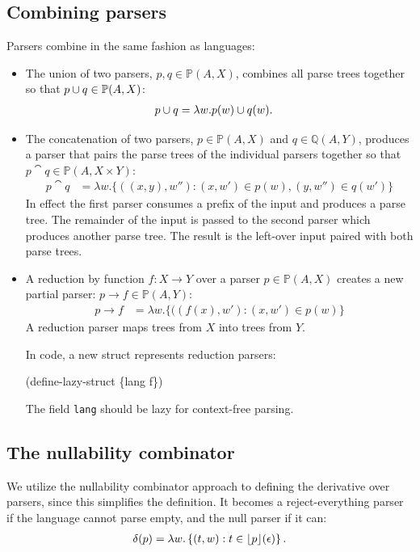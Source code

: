 \subsection{Combining parsers}
Parsers combine in the same fashion as languages:
\begin{itemize}
\item 
The union of two parsers,
$p, q \in \mathbb{P}(A,X)$,  combines all parse trees together
so that $p \cup q \in \mathbb{P}(A,X)$:
\begin{align*}
p \cup q &=
\lambda w .
p(w) \cup q(w)
\text.
\end{align*}

\item 
The concatenation of two parsers, 
$p \in \mathbb{P}(A,X)$
and
$q \in \mathbb{Q}(A,Y)$,
produces a parser that pairs the parse trees of the individual parsers together
so that $p \cat q \in \mathbb{P}(A,X \times Y)$:
\begin{align*}
p \cat q &=
\lambda w .
\{
((x,y),w'') : 
(x,w') \in p(w) ,
(y,w'') \in q(w')
\}
\end{align*}
In effect the first parser consumes a prefix of the input and produces a parse
tree.
%
The remainder of the input is passed to the second parser which produces
another parse tree.
%
The result is the left-over input paired with both parse trees.


\item
A reduction by function $f : X \to Y$ over a parser $p \in \mathbb{P}(A,X)$ creates a new partial parser:
$p \to f \in \mathbb{P}(A,Y)$:
\begin{align*}
p \to f &=
\lambda w .
\{
((f(x), w')
:
(x,w') \in p(w)
\}
\end{align*}
A reduction parser maps trees from $X$ into trees from $Y$.

In code, a new struct represents reduction parsers:
%
\begin{code}
 (define-lazy-struct \ttred \{lang f\})\end{code}
%
The field {\tt lang} should be lazy for context-free parsing.


\end{itemize}



\subsection{The nullability combinator}

We utilize the nullability combinator 
approach to defining the derivative over parsers,
since this simplifies
the definition.
%
It becomes a reject-everything parser if the language cannot parse empty,
and the null parser if it can: 
\begin{align*}
\delta(p) = 
\lambda w . \left\{  (t,w)  :  t  \in \lfloor p \rfloor(\epsilon) \right\}
\text.
\end{align*}


